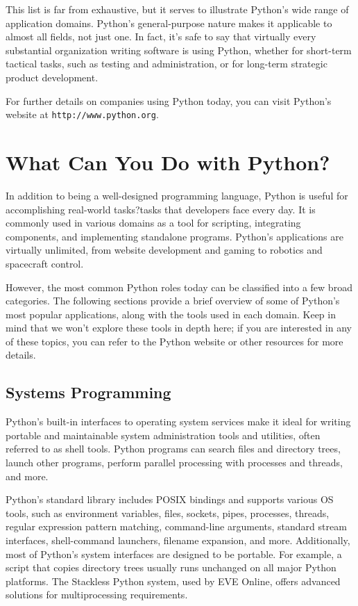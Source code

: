 \documentclass[12pt]{book}
\begin{document}
This list is far from exhaustive, but it serves to illustrate Python's wide range of application domains. Python's general-purpose nature makes it applicable to almost all fields, not just one. In fact, it's safe to say that virtually every substantial organization writing software is using Python, whether for short-term tactical tasks, such as testing and administration, or for long-term strategic product development.

For further details on companies using Python today, you can visit Python's website at \texttt{http://www.python.org}.

\section{What Can You Do with Python?}

In addition to being a well-designed programming language, Python is useful for accomplishing real-world tasks?tasks that developers face every day. It is commonly used in various domains as a tool for scripting, integrating components, and implementing standalone programs. Python's applications are virtually unlimited, from website development and gaming to robotics and spacecraft control.

However, the most common Python roles today can be classified into a few broad categories. The following sections provide a brief overview of some of Python's most popular applications, along with the tools used in each domain. Keep in mind that we won't explore these tools in depth here; if you are interested in any of these topics, you can refer to the Python website or other resources for more details.

\subsection{Systems Programming}

Python's built-in interfaces to operating system services make it ideal for writing portable and maintainable system administration tools and utilities, often referred to as shell tools. Python programs can search files and directory trees, launch other programs, perform parallel processing with processes and threads, and more.

Python's standard library includes POSIX bindings and supports various OS tools, such as environment variables, files, sockets, pipes, processes, threads, regular expression pattern matching, command-line arguments, standard stream interfaces, shell-command launchers, filename expansion, and more. Additionally, most of Python's system interfaces are designed to be portable. For example, a script that copies directory trees usually runs unchanged on all major Python platforms. The Stackless Python system, used by EVE Online, offers advanced solutions for multiprocessing requirements.
\end{document}
